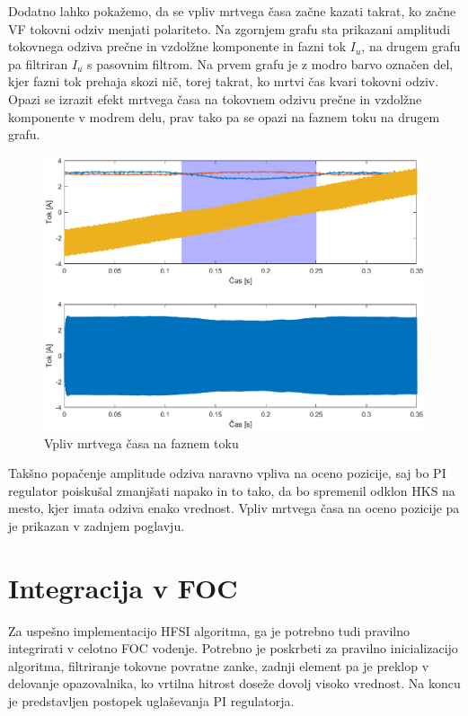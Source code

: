 \documentclass[a4paper,twoside,openright,12pt,slovene]{book}
\begin{document}
Dodatno lahko pokažemo, da se vpliv mrtvega časa začne kazati takrat, ko začne VF tokovni odziv menjati polariteto. Na zgornjem grafu sta prikazani amplitudi tokovnega odziva prečne in vzdolžne
komponente in fazni tok $I_u$, na drugem grafu pa filtriran $I_u$ s pasovnim filtrom. Na prvem grafu je z modro barvo označen del, kjer fazni tok prehaja skozi nič, torej takrat, ko mrtvi čas kvari
tokovni odziv. Opazi se izrazit efekt mrtvega časa na tokovnem odzivu prečne in vzdolžne komponente v modrem delu, prav tako pa se opazi na faznem toku na drugem grafu.

\begin{figure}[!htbp]
    \centering
    \includegraphics[width=1\columnwidth]{Slike/mrtviCasFazniTok.eps}
    \caption{\label{mrtviCasFazniTok} Vpliv mrtvega časa na faznem toku }
\end{figure}


Takšno popačenje amplitude odziva naravno vpliva na oceno pozicije, saj bo PI regulator poiskušal zmanjšati napako in to tako, da bo spremenil odklon HKS na mesto, kjer imata odziva enako vrednost.
Vpliv mrtvega časa na oceno pozicije pa je prikazan v zadnjem poglavju.

\chapter{Integracija v FOC} \label{integracija}

Za uspešno implementacijo HFSI algoritma, ga je potrebno tudi pravilno integrirati v celotno FOC vodenje. Potrebno je poskrbeti za pravilno inicializacijo algoritma, filtriranje tokovne povratne
zanke, zadnji element pa je preklop v delovanje opazovalnika, ko vrtilna hitrost doseže dovolj visoko vrednost. Na koncu je predstavljen postopek uglaševanja PI regulatorja.
\end{document}
